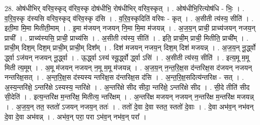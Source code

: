 \documentclass[17pt]{extarticle}
\begin{document}
28. ओष॑धीभिर् वरिव॒स्कृद् व॑रिव॒स्कृ दोष॑धीभि॒ रोष॑धीभिर् वरिव॒स्कृत् । . ओष॑धीभि॒रित्योष॑धि - भिः॒ । . व॒रि॒व॒स्कृ द॑स्यसि वरिव॒स्कृद् व॑रिव॒स्कृ द॑सि । . व॒रि॒व॒स्कृदिति॑ वरिवः - कृत् । . अ॒सीती त्य॑स्य॒ सीति॑ । . इती॒मा मि॒मा मितीती॒माम् । . इ॒मा म॑जयन् नजयन् नि॒मा मि॒मा म॑जयन्न् । . अ॒ज॒य॒न् प्राची॒ प्राच्य॑जयन् नजय॒न् प्राची᳚ । . प्राच्य॑स्यसि॒ प्राची॒ प्राच्य॑सि । . अ॒सीती त्य॑स्य॒ सीति॑ । . इति॒ प्राची॒म् प्राची॒ मितीति॒ प्राची᳚म् । . प्राची॒म् दिश॒म् दिश॒म् प्राची॒म् प्राची॒म् दिश᳚म् । . दिश॑ मजयन् नजय॒न् दिश॒म् दिश॑ मजयन्न् । . अ॒ज॒य॒न् नू॒र्द्ध्वो र्द्ध्वा ऽज॑यन् नजयन् नू॒र्द्ध्वा । . ऊ॒र्द्ध्वा ऽस्य॑ स्यू॒र्द्ध्वो र्द्ध्वा ऽसि॑ । . अ॒सीती त्य॑स्य॒ सीति॑ । . इत्य॒मू म॒मू मिती त्य॒मूम् । . अ॒मू म॑जयन् नजयन् न॒मू म॒मू म॑जयन्न् । . अ॒ज॒य॒न् न॒न्त॒रि॒क्ष॒स द॑न्तरिक्ष॒स द॑जयन् नजयन् नन्तरिक्ष॒सत् । . अ॒न्त॒रि॒क्ष॒स द॑स्यस्य न्तरिक्ष॒स द॑न्तरिक्ष॒स द॑सि । . अ॒न्त॒रि॒क्ष॒सदित्य॑न्तरिक्ष - सत् । . अ॒स्य॒न्तरि॑क्षे॒ ऽन्तरि॑क्षे ऽस्यस्य॒ न्तरि॑क्षे । . अ॒न्तरि॑क्षे सीद सीदा॒ न्तरि॑क्षे॒ ऽन्तरि॑क्षे सीद । . सी॒दे तीति॑ सीद सी॒देति॑ । . इत्य॒न्तरि॑क्ष म॒न्तरि॑क्ष॒ मितीत्य॒ न्तरि॑क्षम् । . अ॒न्तरि॑क्ष मजयन् नजयन् न॒न्तरि॑क्ष म॒न्तरि॑क्ष मजयन्न् । . अ॒ज॒य॒न् तत॒ स्ततो॑ ऽजयन् नजय॒न् ततः॑ । . ततो॑ दे॒वा दे॒वा स्तत॒ स्ततो॑ दे॒वाः । . दे॒वा अभ॑व॒न् नभ॑वन् दे॒वा दे॒वा अभ॑वन्न् । . अभ॑व॒न् परा॒ परा ऽभ॑व॒न् नभ॑व॒न् परा᳚ । \newline
\end{document}
